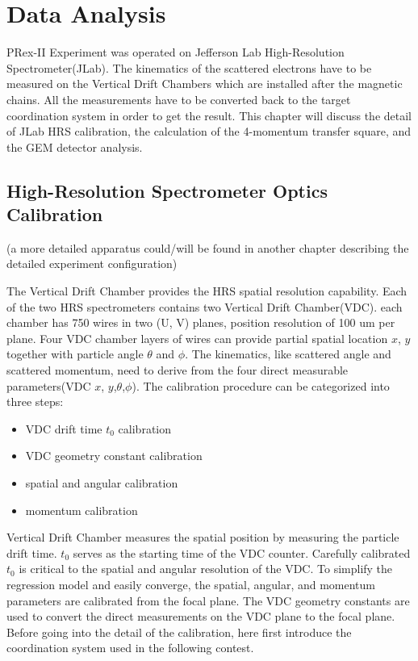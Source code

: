 \chapter{Data Analysis}

PRex-II Experiment was operated on Jefferson Lab High-Resolution Spectrometer(JLab). The kinematics of the scattered electrons have to be measured on the Vertical Drift Chambers which are installed after the magnetic chains. All the measurements have to be converted back to the target coordination system in order to get the result. This chapter will discuss the detail of JLab HRS calibration, the calculation of the 4-momentum transfer square, and the GEM detector analysis. 


\section{High-Resolution Spectrometer Optics Calibration}

(a more detailed apparatus could/will be found in another chapter describing the detailed experiment configuration)

The Vertical Drift Chamber provides the HRS spatial resolution capability. Each of the two HRS spectrometers contains two Vertical Drift Chamber(VDC). each chamber has 750 wires in two (U, V) planes, position resolution of 100 um per plane. Four VDC chamber layers of wires can provide partial spatial location $x$, $y$ together with particle angle $\theta$ and $\phi$. The kinematics, like scattered angle and scattered momentum, need to derive from the four direct measurable parameters(VDC $x$, $y$,$\theta$,$\phi$). The calibration procedure can be categorized into three steps:

\begin{itemize}
    \item VDC drift time $t_0$ calibration
    \item VDC geometry constant calibration 
    \item spatial and angular calibration
    \item momentum calibration
\end{itemize}

Vertical Drift Chamber measures the spatial position by measuring the particle drift time. $t_0$ serves as the starting time of the VDC counter. Carefully calibrated $t_0$ is critical to the spatial and angular resolution of the VDC. To simplify the regression model and easily converge, the spatial, angular, and momentum parameters are calibrated from the focal plane. The VDC geometry constants are used to convert the direct measurements on the VDC plane to the focal plane. Before going into the detail of the calibration, here first introduce the coordination system used in the following contest. 
